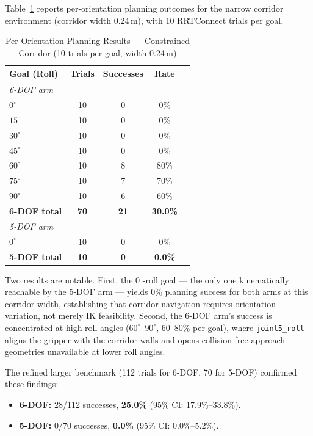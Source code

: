 \documentclass[conference]{IEEEtran}
\begin{document}
	Table~\ref{tab:planning_detail} reports per-orientation planning
	outcomes for the narrow corridor environment (corridor width
	0.24\,m), with 10 RRTConnect trials per goal.
	
	\begin{table}[t]
		\centering
		\caption{Per-Orientation Planning Results — Constrained Corridor
			(10 trials per goal, width 0.24\,m)}
		\label{tab:planning_detail}
		\renewcommand{\arraystretch}{1.2}
		\small
		\begin{tabular}{lcccc}
			\toprule
			\textbf{Goal (Roll)} & \textbf{Trials} & \textbf{Successes} & \textbf{Rate} \\
			\midrule
			\multicolumn{4}{l}{\textit{6-DOF arm}} \\
			$0^\circ$  & 10 & 0 &  0\%  \\
			$15^\circ$ & 10 & 0 &  0\%  \\
			$30^\circ$ & 10 & 0 &  0\%  \\
			$45^\circ$ & 10 & 0 &  0\%  \\
			$60^\circ$ & 10 & 8 & 80\%  \\
			$75^\circ$ & 10 & 7 & 70\%  \\
			$90^\circ$ & 10 & 6 & 60\%  \\
			\midrule
			\textbf{6-DOF total} & \textbf{70} & \textbf{21} & \textbf{30.0\%} \\
			\midrule
			\multicolumn{4}{l}{\textit{5-DOF arm}} \\
			$0^\circ$  & 10 & 0 &  0\%  \\
			\midrule
			\textbf{5-DOF total} & \textbf{10} & \textbf{0} & \textbf{0.0\%}  \\
			\bottomrule
		\end{tabular}
	\end{table}
	
	Two results are notable. First, the $0^\circ$-roll goal —
	the only one kinematically reachable by the 5-DOF arm —
	yields 0\% planning success for both arms at this corridor
	width, establishing that corridor navigation requires
	orientation variation, not merely IK feasibility. Second,
	the 6-DOF arm's success is concentrated at high roll angles
	($60^\circ$--$90^\circ$, 60--80\% per goal), where
	\texttt{joint5\_roll} aligns the gripper with the corridor
	walls and opens collision-free approach geometries unavailable
	at lower roll angles.
	
	The refined larger benchmark (112 trials for 6-DOF, 70 for
	5-DOF) confirmed these findings:
	
	\begin{itemize}
		\item \textbf{6-DOF:} 28/112 successes, \textbf{25.0\%}
		(95\% CI: 17.9\%--33.8\%).
		\item \textbf{5-DOF:} 0/70 successes, \textbf{0.0\%}
		(95\% CI: 0.0\%--5.2\%).
	\end{itemize}
	
\end{document}
